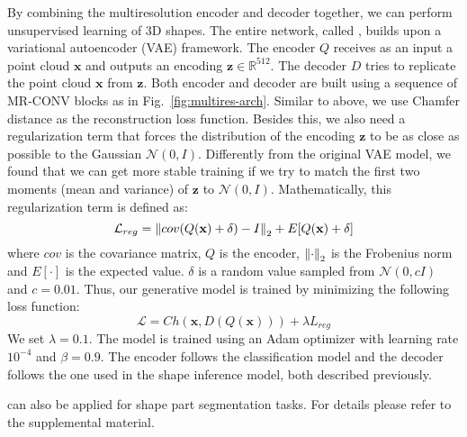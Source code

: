  By combining the multiresolution encoder and decoder together, we can perform unsupervised learning of 3D shapes. The entire network, called \mrvae, builds upon a variational autoencoder (VAE) \cite{vae} framework. %
The encoder $Q$ receives as an input a point cloud $\mathbf{x}$ and outputs an encoding $\mathbf{z} \in \mathbb{R}^{512}$. The decoder $D$ tries to replicate the point cloud $\mathbf{x}$ from $\mathbf{z}$. Both encoder and decoder are built using a sequence of MR-CONV blocks as in Fig.~\ref{fig:multires-arch}. Similar to above, we use Chamfer distance as the reconstruction loss function. Besides this, we also need a regularization term that forces the distribution
of the encoding $\mathbf{z}$ to be as close as possible to the Gaussian $\mathcal{N}(0,I)$. Differently from the original VAE model, we found that we can get more stable training if we try to match the first two moments (mean and variance) of $\mathbf{z}$ to $\mathcal{N}(0,I)$. Mathematically, this regularization term is defined as:
\begin{equation}
	\mathcal{L}_{reg} = \left\lVert cov(Q(\mathbf{x}) + \delta) - I\right\rVert_2 + E[Q(\mathbf{x}) + \delta] \nonumber
\end{equation}
where $cov$ is the covariance matrix, $Q$ is the encoder, $\left\lVert\cdot\right\rVert_2$ is the Frobenius norm and $E[\cdot]$ is the
expected value.
$\delta$ is a random value sampled from $\mathcal{N}(0,cI)$ and $c=0.01$.
Thus, our generative model is trained by minimizing the following loss function:
\begin{equation}
	\mathcal{L} = Ch(\mathbf{x}, D(Q(\mathbf{x}))) + \lambda L_{reg} \nonumber
\end{equation}
We set $\lambda=0.1$. The model is trained using an Adam optimizer with learning rate $10^{-4}$ and $\beta = 0.9$.
The encoder follows the classification model and the decoder follows the one used in the shape inference model, both described previously.

 \mrtnet can also be applied for shape part segmentation tasks. For details please refer to the supplemental material.

